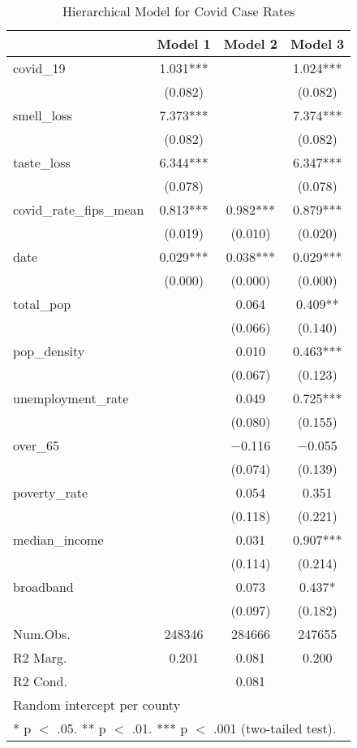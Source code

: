 \begin{table}[!h]

\caption{\label{tab:covid_analysis}Hierarchical Model for Covid Case Rates}
\centering
\fontsize{8}{10}\selectfont

\begin{tabular}{lccc}
\toprule
  & Model 1 & Model 2 & Model 3\\
\midrule
covid\_19 & \num{1.031}*** &  & \num{1.024}***\\
 & (\num{0.082}) &  & \vphantom{1} (\num{0.082})\\
smell\_loss & \num{7.373}*** &  & \num{7.374}***\\
 & (\num{0.082}) &  & (\num{0.082})\\
taste\_loss & \num{6.344}*** &  & \num{6.347}***\\
 & (\num{0.078}) &  & (\num{0.078})\\
covid\_rate\_fips\_mean & \num{0.813}*** & \num{0.982}*** & \num{0.879}***\\
 & (\num{0.019}) & (\num{0.010}) & (\num{0.020})\\
date & \num{0.029}*** & \num{0.038}*** & \num{0.029}***\\
 & (\num{0.000}) & (\num{0.000}) & (\num{0.000})\\
total\_pop &  & \num{0.064} & \num{0.409}**\\
 &  & (\num{0.066}) & (\num{0.140})\\
pop\_density &  & \num{0.010} & \num{0.463}***\\
 &  & (\num{0.067}) & (\num{0.123})\\
unemployment\_rate &  & \num{0.049} & \num{0.725}***\\
 &  & (\num{0.080}) & (\num{0.155})\\
over\_65 &  & \num{-0.116} & \num{-0.055}\\
 &  & (\num{0.074}) & (\num{0.139})\\
poverty\_rate &  & \num{0.054} & \num{0.351}\\
 &  & (\num{0.118}) & (\num{0.221})\\
median\_income &  & \num{0.031} & \num{0.907}***\\
 &  & (\num{0.114}) & (\num{0.214})\\
broadband &  & \num{0.073} & \num{0.437}*\\
 &  & (\num{0.097}) & (\num{0.182})\\
\midrule
Num.Obs. & \num{248346} & \num{284666} & \num{247655}\\
R2 Marg. & \num{0.201} & \num{0.081} & \num{0.200}\\
R2 Cond. &  & \num{0.081} & \\
\bottomrule
\multicolumn{4}{l}{\rule{0pt}{1em}Random intercept per county}\\
\multicolumn{4}{l}{\rule{0pt}{1em}* p $<$ .05. ** p $<$ .01. *** p $<$ .001 (two-tailed test).}\\
\end{tabular}
\end{table}